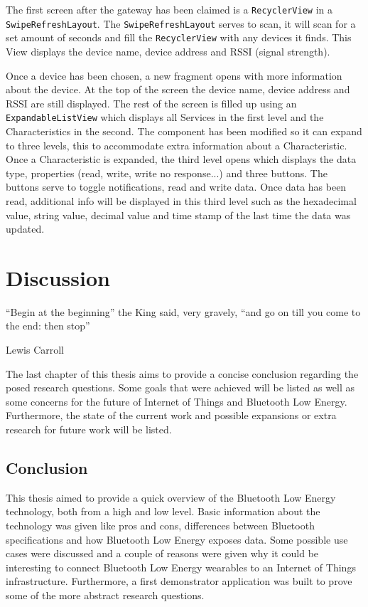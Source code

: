 \documentclass[pdftex,a4paper,12pt,twoside]{report}
\begin{document}
The first screen after the gateway has been claimed is a \texttt{RecyclerView} in a \texttt{SwipeRefreshLayout}. The \texttt{SwipeRefreshLayout} serves to scan, it will scan for a set amount of seconds and fill the \texttt{RecyclerView} with any devices it finds. This View displays the device name, device address and RSSI (signal strength).

Once a device has been chosen, a new fragment opens with more information about the device. At the top of the screen the device name, device address and RSSI are still displayed. The rest of the screen is filled up using an \texttt{ExpandableListView} which displays all Services in the first level and the Characteristics in the second. The component has been modified so it can expand to three levels, this to accommodate extra information about a Characteristic. Once a Characteristic is expanded, the third level opens which displays the data type, properties (read, write, write no response...) and three buttons. The buttons serve to toggle notifications, read and write data. Once data has been read, additional info will be displayed in this third level such as the hexadecimal value, string value, decimal value and time stamp of the last time the data was updated.

\chapter{Discussion}
\label{ch:discussion}
\epigraph{``Begin at the beginning'' the King said, very gravely, ``and go on till you come to the end: then stop''}{Lewis Carroll}
The last chapter of this thesis aims to provide a concise conclusion regarding the posed research questions. Some goals that were achieved will be listed as well as some concerns for the future of Internet of Things and Bluetooth Low Energy. Furthermore, the state of the current work and possible expansions or extra research for future work will be listed.

\section{Conclusion}
\label{sec:conclusion}
This thesis aimed to provide a quick overview of the Bluetooth Low Energy technology, both from a high and low level. Basic information about the technology was given like pros and cons, differences between Bluetooth specifications and how Bluetooth Low Energy exposes data. Some possible use cases were discussed and a couple of reasons were given why it could be interesting to connect Bluetooth Low Energy wearables to an Internet of Things infrastructure. Furthermore, a first demonstrator application was built to prove some of the more abstract research questions.
\end{document}
